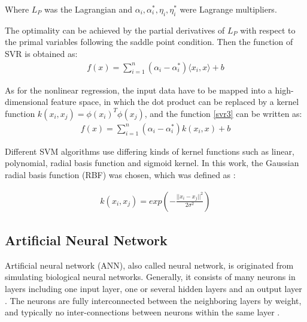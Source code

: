 \documentclass[11pt]{article}
\begin{document}
	Where $L_P$ was the Lagrangian and $ \alpha_i, \alpha_i^*, \eta_i, \eta_i^* $ were Lagrange multipliers.
	
	The optimality can be achieved by the partial derivatives of $L_P$ with respect to the primal variables following the saddle point condition. Then the function of SVR is obtained as:
	\begin{eqnarray}\label{svr3}
	f(x) = \sum_{i=1}^{n} (\alpha_i - \alpha_i^*)\langle x_i , x \rangle +b                                                             
	\end{eqnarray}
	
	As for the nonlinear regression, the input data have to be mapped into a high-dimensional feature space, in which the dot product can be replaced by a kernel function $k(x_i, x_j) = \phi(x_i)^T\phi(x_j)$, and the function \eqref{svr3} can be written as:
	\begin{eqnarray}
	f(x) = \sum_{i=1}^{n}(\alpha_i - \alpha_i^*)k(x_i , x) +b                                                          
	\end{eqnarray}
	
	Different SVM algorithms use differing kinds of kernel functions such as linear, polynomial, radial basis function and sigmoid kernel. In this work, the Gaussian radial basis function (RBF) was chosen, which was defined as \cite{smola2004tutorial}:

	\begin{eqnarray}
	k(x_i, x_j) = exp ({- \frac{||x_i -x_j ||^2}{2 \sigma^2} })                                                           
	\end{eqnarray}
	
	
	\subsection{Artificial Neural Network}
	Artificial neural network (ANN), also called neural network, is originated from simulating biological neural networks. Generally, it consists of many neurons in layers including one input layer, one or several hidden layers and an output layer \cite{mukherjee1997artificial}. The neurons are fully interconnected between the neighboring layers by weight, and typically no inter-connections between neurons within the same layer \cite{naderpour2018compressive}. 
	
\end{document}
